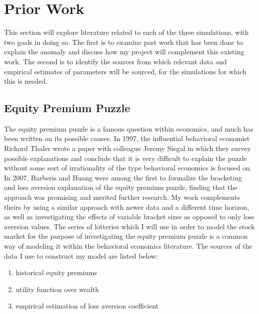 \documentclass[10pt,twocolumn]{article}
\begin{document}
\section{Prior Work}
This section will explore literature related to each of the three simulations, with two goals in doing so. The first is to examine past work that has been done to explain the anomaly and discuss how my project will complement this existing work. The second is to identify the sources from which relevant data and empirical estimates of parameters will be sourced, for the simulations for which this is needed.



\subsection{Equity Premium Puzzle}
The equity premium puzzle is a famous question within economics, and much has been written on its possible causes. In 1997, the influential behavioral economist Richard Thaler wrote a paper with colleague Jeremy Siegal in which they survey possible explanations and conclude that it is very difficult to explain the puzzle without some sort of irrationality of the type behavioral economics is focused on.\cite{thaler}  In 2007, Barberis and Huang were among the first to formalize the bracketing and loss aversion explanation of the equity premium puzzle, finding that the approach was promising and merited further research.\cite{BarberisEPP} My work complements theirs by using a similar approach with newer data and a different time horizon, as well as investigating the effects of variable bracket sizes as opposed to only loss aversion values. The series of lotteries which I will use in order to model the stock market for the purpose of investigating the equity premium puzzle is a common way of modeling it within the behavioral economics literature. The sources of the data I use to construct my model are listed below:
\begin{enumerate}
    \item historical equity premiums\cite{equitypremiums}
    \item utility function over wealth\cite{utilitywealth}
    \item empirical estimation of loss aversion coefficient\cite{lossaversion}
\end{enumerate}
\end{document}
